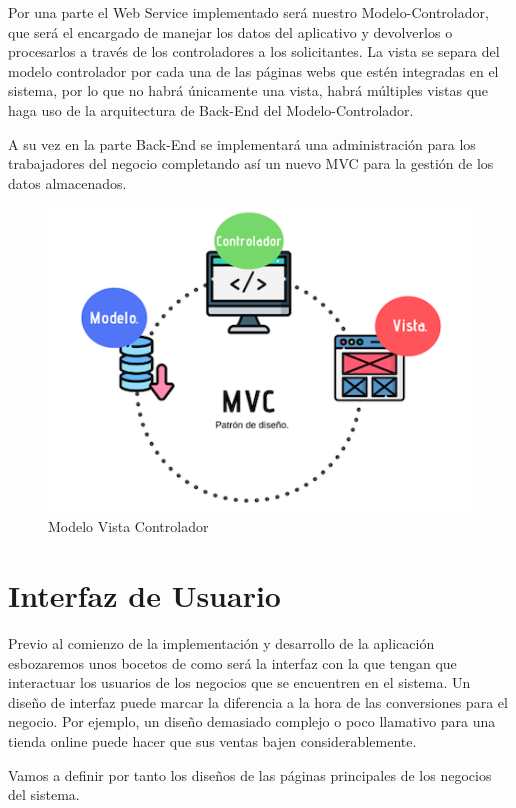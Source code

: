 Por una parte el Web Service implementado será nuestro Modelo-Controlador, que será el encargado de manejar los datos del aplicativo y devolverlos o procesarlos a través de los controladores a los solicitantes. La vista se separa del modelo controlador por cada una de las páginas webs que estén integradas en el sistema, por lo que no habrá únicamente una vista, habrá múltiples vistas que haga uso de la arquitectura de Back-End del Modelo-Controlador.

A su vez en la parte Back-End se implementará una administración para los trabajadores del negocio completando así un nuevo MVC para la gestión de los datos almacenados.

\begin{figure}[H]
  \centering
  \includegraphics[scale=0.6]{images/Modelo_Vista_Controlador.png}
  \caption{Modelo Vista Controlador}
  \label{}
\end{figure}

\section{Interfaz de Usuario}

Previo al comienzo de la implementación y desarrollo de la aplicación esbozaremos unos bocetos de como será la interfaz con la que tengan que interactuar los usuarios de los negocios que se encuentren en el sistema. Un diseño de interfaz \cite{design} puede marcar la diferencia a la hora de las conversiones para el negocio. Por ejemplo, un diseño demasiado complejo o poco llamativo para una tienda online puede hacer que sus ventas bajen considerablemente.

Vamos a definir por tanto los diseños de las páginas principales de los negocios del sistema.

